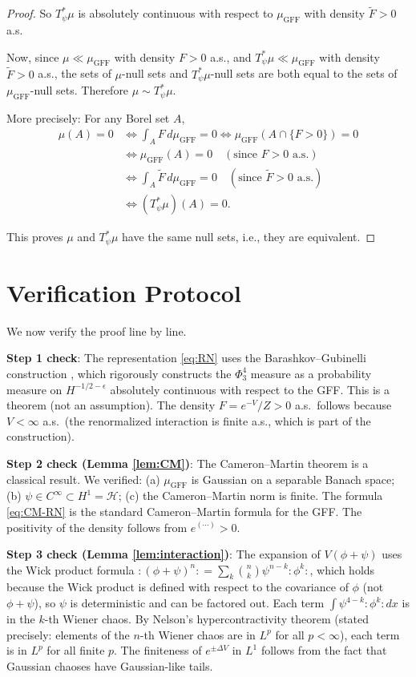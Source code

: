 \documentclass[12pt]{article}
\begin{document}
\begin{proof}
So $T_\psi^* \mu$ is absolutely continuous with respect to $\mu_{\mathrm{GFF}}$ with density $\tilde{F} > 0$ a.s.

Now, since $\mu \ll \mu_{\mathrm{GFF}}$ with density $F > 0$ a.s., and $T_\psi^* \mu \ll \mu_{\mathrm{GFF}}$ with density $\tilde{F} > 0$ a.s., the sets of $\mu$-null sets and $T_\psi^* \mu$-null sets are both equal to the sets of $\mu_{\mathrm{GFF}}$-null sets. Therefore $\mu \sim T_\psi^* \mu$.

More precisely: For any Borel set $A$,
\begin{align*}
\mu(A) = 0 &\iff \int_A F \, d\mu_{\mathrm{GFF}} = 0 \iff \mu_{\mathrm{GFF}}(A \cap \{F > 0\}) = 0 \\
&\iff \mu_{\mathrm{GFF}}(A) = 0 \quad (\text{since } F > 0 \text{ a.s.}) \\
&\iff \int_A \tilde{F} \, d\mu_{\mathrm{GFF}} = 0 \quad (\text{since } \tilde{F} > 0 \text{ a.s.}) \\
&\iff (T_\psi^* \mu)(A) = 0.
\end{align*}

This proves $\mu$ and $T_\psi^* \mu$ have the same null sets, i.e., they are equivalent.
\end{proof}

\section{Verification Protocol}

We now verify the proof line by line.

\textbf{Step 1 check}: The representation \eqref{eq:RN} uses the Barashkov--Gubinelli construction \cite{BG2020}, which rigorously constructs the $\Phi^4_3$ measure as a probability measure on $H^{-1/2-\epsilon}$ absolutely continuous with respect to the GFF. This is a theorem (not an assumption). The density $F = e^{-V}/Z > 0$ a.s.\ follows because $V < \infty$ a.s.\ (the renormalized interaction is finite a.s., which is part of the construction).

\textbf{Step 2 check (Lemma \ref{lem:CM})}: The Cameron--Martin theorem is a classical result. We verified: (a) $\mu_{\mathrm{GFF}}$ is Gaussian on a separable Banach space; (b) $\psi \in C^\infty \subset H^1 = \mathcal{H}$; (c) the Cameron--Martin norm is finite. The formula \eqref{eq:CM-RN} is the standard Cameron--Martin formula for the GFF. The positivity of the density follows from $e^{(\cdots)} > 0$.

\textbf{Step 3 check (Lemma \ref{lem:interaction})}: The expansion of $V(\phi+\psi)$ uses the Wick product formula $:(\phi+\psi)^n: = \sum_k \binom{n}{k}\psi^{n-k}:\phi^k:$, which holds because the Wick product is defined with respect to the covariance of $\phi$ (not $\phi+\psi$), so $\psi$ is deterministic and can be factored out. Each term $\int \psi^{4-k}:\phi^k: dx$ is in the $k$-th Wiener chaos. By Nelson's hypercontractivity theorem \cite{Nelson1973} (stated precisely: elements of the $n$-th Wiener chaos are in $L^p$ for all $p < \infty$), each term is in $L^p$ for all finite $p$. The finiteness of $e^{\pm\Delta V}$ in $L^1$ follows from the fact that Gaussian chaoses have Gaussian-like tails.
\end{document}
